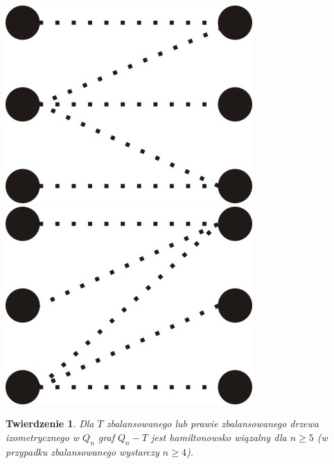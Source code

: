 \documentclass{pracamgr}
\newtheorem{theorem}{Twierdzenie}[chapter]
\begin{document}
     \begin{center}
      \includegraphics[scale=0.5]{img/Q_hamilton_t1.jpg}\quad\quad\quad\quad
      \includegraphics[scale=0.5]{img/Q_hamilton_t2.jpg}
     \end{center}
    \begin{theorem}\label{Hamilton - drzewo izo}
     Dla $T$ zbalansowanego lub prawie zbalansowanego drzewa izometrycznego w $Q_n$ graf $Q_n-T$ jest hamiltonowsko wiązalny dla $n\ge5$
     (w przypadku zbalansowanego wystarczy $n\ge4$).
    \end{theorem}
\end{document}
